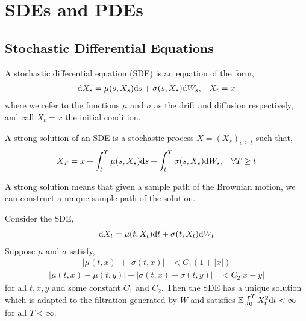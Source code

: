 \documentclass[12pt]{article}
\begin{document}
\section{SDEs and PDEs}

\subsection{Stochastic Differential Equations}
\begin{definition}
A stochastic differential equation (SDE) is an equation of the form,
\begin{align*}
    \mathrm{d} X_s = \mu(s,X_s)\mathrm{d} s + \sigma(s,X_s) \mathrm{d} W_s, && X_t = x
\end{align*}
where we refer to the functions \( \mu \) and \( \sigma \) as the drift and diffusion respectively, and call \( X_t = x \) the initial condition.
\end{definition}

\begin{definition}
A strong solution of an SDE is a stochastic process \( X = (X_s)_{s\geq t} \) such that,
\begin{align*}
    X_T = x + \int_t^T \mu(s,X_s)\mathrm{d} s + \int_t^T \sigma(s,X_s) \mathrm{d} W_s, && \forall T\geq t
\end{align*}
\end{definition}

A strong solution means that given a sample path of the Brownian motion, we can construct  a unique sample path of the solution.

\begin{theorem}
Consider the SDE,
\begin{align*}
    \mathrm{d} X_t = \mu(t,X_t)\mathrm{d} t + \sigma(t,X_t)\mathrm{d} W_t
\end{align*}
Suppose \( \mu \) and \( \sigma \) satisfy,
\begin{align*}
    |\mu(t,x)| + |\sigma(t,x)| &< C_1 (1+|x|)
\end{align*}\vspace{-1em}
\begin{align*}
    |\mu(t,x)-\mu(t,y)| + |\sigma(t,x)+\sigma(t,y)| &< C_2|x-y|
\end{align*}
for all \( t,x,y \) and some constant \( C_1 \) and \( C_2 \). Then the SDE has a unique solution which is adapted to the filtration generated by \( W \) and satisfies \( \mathbb{E} \int_0^T X_t^2\mathrm{d} t <\infty \) for all \( T<\infty \).
\end{theorem}
\end{document}
